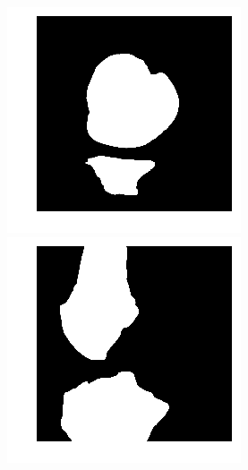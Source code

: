 \begin{figure}[H]
  \includegraphics[width=\linewidth]{imgs/transfer_pers_y1.png}
\endminipage\hfill
{}
  \includegraphics[width=\linewidth]{imgs/transfer_pers_y2.png}
\endminipage\hfill
{}%

\end{figure}
